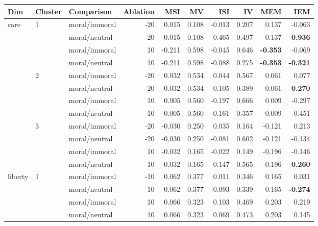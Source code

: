 \documentclass[runninghheads]{llncs}
\begin{document}
\begin{table}[!ht]
    \centering
    \begingroup
    \scriptsize
    \begin{tabular}{|l|l|l|r|r|r|r|r|r|r|}
    \hline
        \textbf{Dim} & \textbf{Cluster} & \textbf{Comparison} & \textbf{Ablation} & \textbf{MSI} & \textbf{MV} & \textbf{ISI} & \textbf{IV} & \textbf{MEM} & \textbf{IEM} \\ 
            \hline\hline
        \multirow{12}{*}{care} & \multirow{4}{*}{1} & moral/immoral & -20 & 0.015 & 0.108 & -0.013 & 0.207 & 0.137 & -0.063 \\ 
        & & moral/neutral & -20 & 0.015 & 0.108 & 0.465 & 0.497 & 0.137 & \textbf{0.936} \\
        & & moral/immoral & 10 & -0.211 & 0.598 & -0.045 & 0.646 & \textbf{-0.353} & -0.069 \\
        & & moral/neutral & 10 & -0.211 & 0.598 & -0.088 & 0.275 & \textbf{-0.353} & \textbf{-0.321} \\ 
         \cline{2-10}
        & \multirow{4}{*}{2} & moral/immoral & -20 & 0.032 & 0.534 & 0.044 & 0.567 & 0.061 & 0.077 \\
        &  & moral/neutral & -20 & 0.032 & 0.534 & 0.105 & 0.389 & 0.061 & \textbf{0.270} \\ 
        &  & moral/immoral & 10 & 0.005 & 0.560 & -0.197 & 0.666 & 0.009 & -0.297 \\ 
        &  & moral/neutral & 10 & 0.005 & 0.560 & -0.161 & 0.357 & 0.009 & -0.451 \\ 
         \cline{2-10}
        & \multirow{4}{*}{3} & moral/immoral & -20 & -0.030 & 0.250 & 0.035 & 0.164 & -0.121 & 0.213 \\ 
        &  & moral/neutral & -20 & -0.030 & 0.250 & -0.081 & 0.602 & -0.121 & -0.134 \\ 
        &  & moral/immoral & 10 & -0.032 & 0.165 & -0.022 & 0.149 & -0.196 & -0.146 \\ 
        &  & moral/neutral & 10 & -0.032 & 0.165 & 0.147 & 0.565 & -0.196 & \textbf{0.260} \\
        \hline\hline
        \multirow{12}{*}{liberty} & \multirow{4}{*}{1} & moral/immoral & -10 & 0.062 & 0.377 & 0.011 & 0.346 & 0.165 & 0.031 \\ 
         &  & moral/neutral & -10 & 0.062 & 0.377 & -0.093 & 0.339 & 0.165 & \textbf{-0.274} \\ 
         &  & moral/immoral & 10 & 0.066 & 0.323 & 0.103 & 0.469 & 0.203 & 0.219 \\ 
         &  & moral/neutral & 10 & 0.066 & 0.323 & 0.069 & 0.473 & 0.203 & 0.145 \\ 

\end{tabular}
\end{table}
\end{document}
